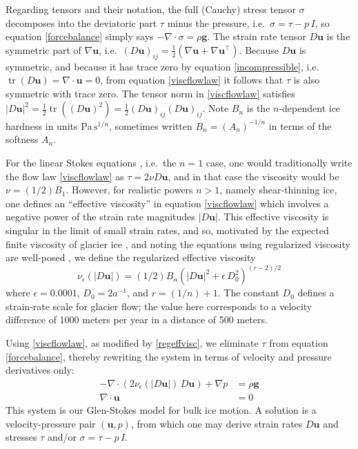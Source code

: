 \documentclass[letterpaper,final,12pt,reqno]{amsart}
\newcommand{\eps}{\epsilon}
\newcommand{\grad}{\nabla}
\newcommand{\Div}{\nabla\cdot}
\newcommand{\trace}{\operatorname{tr}}
\newcommand{\bg}{\mathbf{g}}
\newcommand{\bu}{\mathbf{u}}
\begin{document}
Regarding tensors and their notation, the full (Cauchy) stress tensor $\sigma$ decomposes into the deviatoric part $\tau$ minus the pressure, i.e.~$\sigma = \tau - p\,I$, so equation \eqref{forcebalance} simply says $-\Div \sigma = \rho \bg$.  The strain rate tensor $D\bu$ is the symmetric part of $\grad \bu$, i.e.~$(D\bu)_{ij} = \frac{1}{2} \left(\grad\bu + \grad\bu^\top\right)$.  Because $D\bu$ is symmetric, and because it has trace zero by equation \eqref{incompressible}, i.e.~$\trace(D\bu)=\nabla \cdot \bu = 0$, from equation \eqref{viscflowlaw} it follows that $\tau$ is also symmetric with trace zero.  The tensor norm in \eqref{viscflowlaw} satisfies $|D\bu|^2 = \frac{1}{2} \trace\left((D\bu)^2\right) = \frac{1}{2} (D\bu)_{ij} (D\bu)_{ij}$.  Note $B_n$ is the $n$-dependent ice hardness in units $\text{Pa}\,\text{s}^{1/n}$, sometimes written $B_n = (A_n)^{-1/n}$ in terms of the softness $A_n$.

For the linear Stokes equations \cite{Elmanetal2014}, i.e.~the $n=1$ case, one would traditionally write the flow law \eqref{viscflowlaw} as $\tau = 2\nu D\bu$, and in that case the viscosity would be $\nu = (1/2) B_1$.  However, for realistic powers $n>1$, namely shear-thinning ice, one defines an ``effective viscosity'' in equation \eqref{viscflowlaw} which involves a negative power of the strain rate magnitudes $|D\bu|$.  This effective viscosity is singular in the limit of small strain rates, and so, motivated by the expected finite viscosity of glacier ice \cite{GreveBlatter2009}, and noting the equations using regularized viscosity are well-posed \cite{JouvetRappaz2011}, we define the regularized effective viscosity
\begin{equation}
\nu_\eps(|D\bu|) = (1/2) B_n \left(|D\bu|^2 + \eps\, D_0^2\right)^{(r-2)/2} \label{regeffvisc}
\end{equation}
where $\eps = 0.0001$, $D_0 = 2 a^{-1}$, and $r=(1/n)+1$.  The constant $D_0$ defines a strain-rate scale for glacier flow; the value here corresponds to a velocity difference of 1000 meters per year in a distance of 500 meters.

Using \eqref{viscflowlaw}, as modified by \eqref{regeffvisc}, we eliminate $\tau$ from equation \eqref{forcebalance}, thereby rewriting the system in terms of velocity and pressure derivatives only:
\begin{align}
- \nabla \cdot \left(2 \nu_\eps(|D\bu|)\, D\bu\right) + \nabla p &= \rho \mathbf{g} \label{stokes} \\
\Div \bu &= 0 \label{incompagain}
\end{align}
This system is our Glen-Stokes model for bulk ice motion.  A solution is a velocity-pressure pair $(\bu,p)$, from which one may derive strain rates $D\bu$ and stresses $\tau$ and/or $\sigma = \tau - p\,I$.
\end{document}
